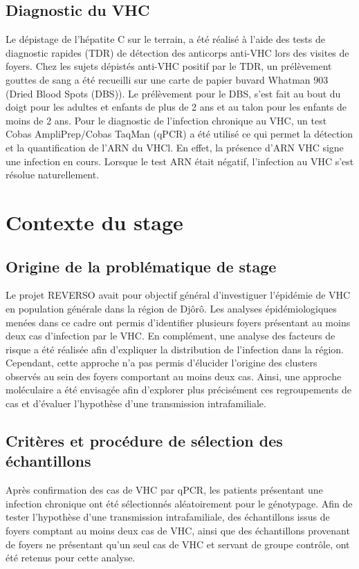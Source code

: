 \documentclass[a4paper,12pt]{article}
\begin{document}
\subsection{Diagnostic du VHC}

Le dépistage de l’hépatite C sur le terrain, a été réalisé à l’aide des tests de diagnostic rapides (TDR) de détection des anticorps anti-VHC lors des visites de foyers. Chez les sujets dépistés anti-VHC positif par le TDR, un prélèvement gouttes de sang a été recueilli sur une carte de papier buvard Whatman 903 (Dried Blood Spots (DBS)). Le prélèvement pour le DBS, s’est fait au bout du doigt pour les adultes et enfants de plus de 2 ans et au talon pour les enfants de moins de 2 ans. Pour le diagnostic de l’infection chronique au VHC, un test Cobas AmpliPrep/Cobas TaqMan (qPCR) a été utilisé ce qui permet la détection et la quantification de l'ARN du VHCl. En effet, la présence d’ARN VHC signe une infection en cours. Lorsque le test ARN était négatif, l’infection au VHC s’est résolue naturellement. 

\section {Contexte du stage}

\subsection{Origine de la problématique de stage}

Le projet REVERSO avait pour objectif général d’investiguer l’épidémie de VHC en population générale dans la région de Djôrô. Les analyses épidémiologiques menées dans ce cadre ont permis d’identifier plusieurs foyers présentant au moins deux cas d’infection par le VHC. En complément, une analyse des facteurs de risque a été réalisée afin d’expliquer la distribution de l’infection dans la région. Cependant, cette approche n’a pas permis d’élucider l’origine des clusters observés au sein des foyers comportant au moins deux cas. Ainsi, une approche moléculaire a été envisagée afin d’explorer plus précisément ces regroupements de cas et d’évaluer l’hypothèse d’une transmission intrafamiliale.

\subsection{Critères et procédure de sélection des échantillons}

Après confirmation des cas de VHC par qPCR, les patients présentant une infection chronique ont été sélectionnés aléatoirement pour le génotypage. Afin de tester l’hypothèse d’une transmission intrafamiliale, des échantillons issus de foyers comptant au moins deux cas de VHC, ainsi que des échantillons provenant de foyers ne présentant qu’un seul cas de VHC et servant de groupe contrôle, ont été retenus pour cette analyse.
\end{document}
